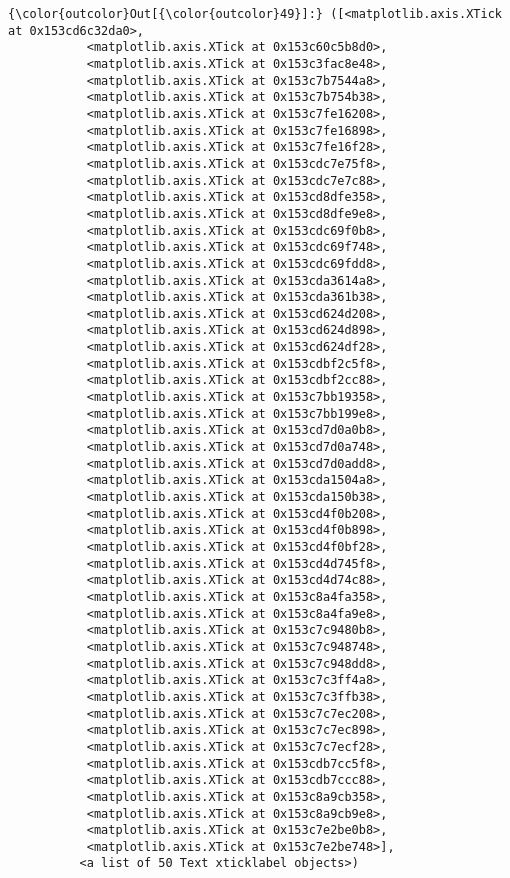 \documentclass[11pt]{article}
\begin{document}
\begin{Verbatim}[commandchars=\\\{\}]
{\color{outcolor}Out[{\color{outcolor}49}]:} ([<matplotlib.axis.XTick at 0x153cd6c32da0>,
           <matplotlib.axis.XTick at 0x153c60c5b8d0>,
           <matplotlib.axis.XTick at 0x153c3fac8e48>,
           <matplotlib.axis.XTick at 0x153c7b7544a8>,
           <matplotlib.axis.XTick at 0x153c7b754b38>,
           <matplotlib.axis.XTick at 0x153c7fe16208>,
           <matplotlib.axis.XTick at 0x153c7fe16898>,
           <matplotlib.axis.XTick at 0x153c7fe16f28>,
           <matplotlib.axis.XTick at 0x153cdc7e75f8>,
           <matplotlib.axis.XTick at 0x153cdc7e7c88>,
           <matplotlib.axis.XTick at 0x153cd8dfe358>,
           <matplotlib.axis.XTick at 0x153cd8dfe9e8>,
           <matplotlib.axis.XTick at 0x153cdc69f0b8>,
           <matplotlib.axis.XTick at 0x153cdc69f748>,
           <matplotlib.axis.XTick at 0x153cdc69fdd8>,
           <matplotlib.axis.XTick at 0x153cda3614a8>,
           <matplotlib.axis.XTick at 0x153cda361b38>,
           <matplotlib.axis.XTick at 0x153cd624d208>,
           <matplotlib.axis.XTick at 0x153cd624d898>,
           <matplotlib.axis.XTick at 0x153cd624df28>,
           <matplotlib.axis.XTick at 0x153cdbf2c5f8>,
           <matplotlib.axis.XTick at 0x153cdbf2cc88>,
           <matplotlib.axis.XTick at 0x153c7bb19358>,
           <matplotlib.axis.XTick at 0x153c7bb199e8>,
           <matplotlib.axis.XTick at 0x153cd7d0a0b8>,
           <matplotlib.axis.XTick at 0x153cd7d0a748>,
           <matplotlib.axis.XTick at 0x153cd7d0add8>,
           <matplotlib.axis.XTick at 0x153cda1504a8>,
           <matplotlib.axis.XTick at 0x153cda150b38>,
           <matplotlib.axis.XTick at 0x153cd4f0b208>,
           <matplotlib.axis.XTick at 0x153cd4f0b898>,
           <matplotlib.axis.XTick at 0x153cd4f0bf28>,
           <matplotlib.axis.XTick at 0x153cd4d745f8>,
           <matplotlib.axis.XTick at 0x153cd4d74c88>,
           <matplotlib.axis.XTick at 0x153c8a4fa358>,
           <matplotlib.axis.XTick at 0x153c8a4fa9e8>,
           <matplotlib.axis.XTick at 0x153c7c9480b8>,
           <matplotlib.axis.XTick at 0x153c7c948748>,
           <matplotlib.axis.XTick at 0x153c7c948dd8>,
           <matplotlib.axis.XTick at 0x153c7c3ff4a8>,
           <matplotlib.axis.XTick at 0x153c7c3ffb38>,
           <matplotlib.axis.XTick at 0x153c7c7ec208>,
           <matplotlib.axis.XTick at 0x153c7c7ec898>,
           <matplotlib.axis.XTick at 0x153c7c7ecf28>,
           <matplotlib.axis.XTick at 0x153cdb7cc5f8>,
           <matplotlib.axis.XTick at 0x153cdb7ccc88>,
           <matplotlib.axis.XTick at 0x153c8a9cb358>,
           <matplotlib.axis.XTick at 0x153c8a9cb9e8>,
           <matplotlib.axis.XTick at 0x153c7e2be0b8>,
           <matplotlib.axis.XTick at 0x153c7e2be748>],
          <a list of 50 Text xticklabel objects>)
\end{Verbatim}
            
\end{document}
